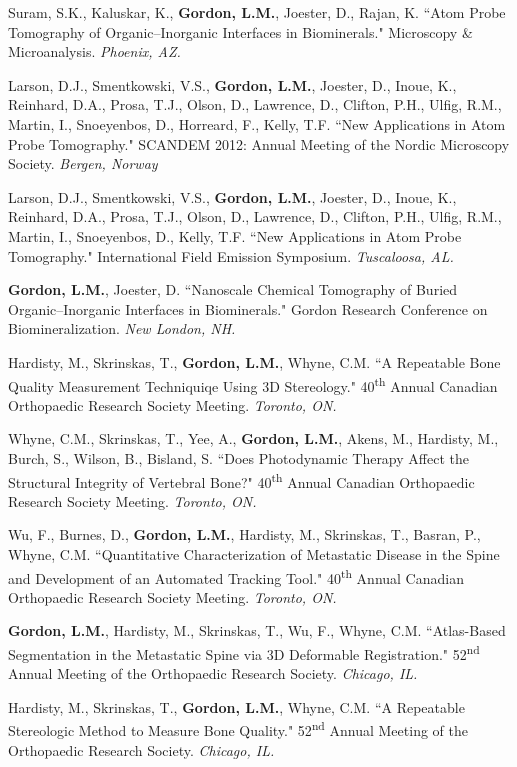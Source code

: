Suram, S.K., Kaluskar, K., \textbf{Gordon, L.M.}, Joester, D., Rajan, K. ``Atom Probe Tomography of Organic--Inorganic Interfaces in Biominerals." Microscopy \& Microanalysis. \emph{Phoenix, AZ.}

Larson, D.J., Smentkowski, V.S., \textbf{Gordon, L.M.}, Joester, D., Inoue, K.,  Reinhard, D.A., Prosa, T.J., Olson, D., Lawrence, D., Clifton, P.H., Ulfig, R.M., Martin, I., Snoeyenbos, D., Horreard, F., Kelly, T.F. ``New Applications in Atom Probe Tomography." SCANDEM 2012: Annual Meeting of the Nordic Microscopy Society. \emph{Bergen, Norway}

Larson, D.J., Smentkowski, V.S., \textbf{Gordon, L.M.}, Joester, D., Inoue, K.,  Reinhard, D.A., Prosa, T.J., Olson, D., Lawrence, D., Clifton, P.H., Ulfig, R.M., Martin, I., Snoeyenbos, D.,  Kelly, T.F. ``New Applications in Atom Probe Tomography." International Field Emission Symposium. \emph{Tuscaloosa, AL.}

\textbf{Gordon, L.M.}, Joester, D. ``Nanoscale Chemical Tomography of Buried Organic--Inorganic Interfaces in Biominerals." Gordon Research Conference on Biomineralization. \emph{New London, NH.}

Hardisty, M., Skrinskas, T., \textbf{Gordon, L.M.}, Whyne, C.M. ``A Repeatable Bone Quality Measurement Techniquiqe Using 3D Stereology." 40\textsuperscript{th} Annual Canadian Orthopaedic Research Society Meeting. \emph{Toronto, ON.}

Whyne, C.M., Skrinskas, T., Yee, A., \textbf{Gordon, L.M.}, Akens, M., Hardisty, M., Burch, S., Wilson, B., Bisland, S. ``Does Photodynamic Therapy Affect the Structural Integrity of Vertebral Bone?" 40\textsuperscript{th} Annual Canadian Orthopaedic Research Society  Meeting. \emph{Toronto, ON.}

Wu, F., Burnes, D., \textbf{Gordon, L.M.}, Hardisty, M., Skrinskas, T., Basran, P., Whyne, C.M. ``Quantitative Characterization of Metastatic Disease in the Spine and Development of an Automated Tracking Tool." 40\textsuperscript{th} Annual Canadian Orthopaedic Research Society Meeting. \emph{Toronto, ON.}

\textbf{Gordon, L.M.}, Hardisty, M., Skrinskas, T., Wu, F., Whyne, C.M. ``Atlas-Based Segmentation in the Metastatic Spine via 3D Deformable Registration." 52\textsuperscript{nd} Annual Meeting of the Orthopaedic Research Society. \emph{Chicago, IL.}

Hardisty, M., Skrinskas, T., \textbf{Gordon, L.M.}, Whyne, C.M. ``A Repeatable Stereologic Method to Measure Bone Quality." 52\textsuperscript{nd} Annual Meeting of the Orthopaedic Research Society. \emph{Chicago, IL.}

